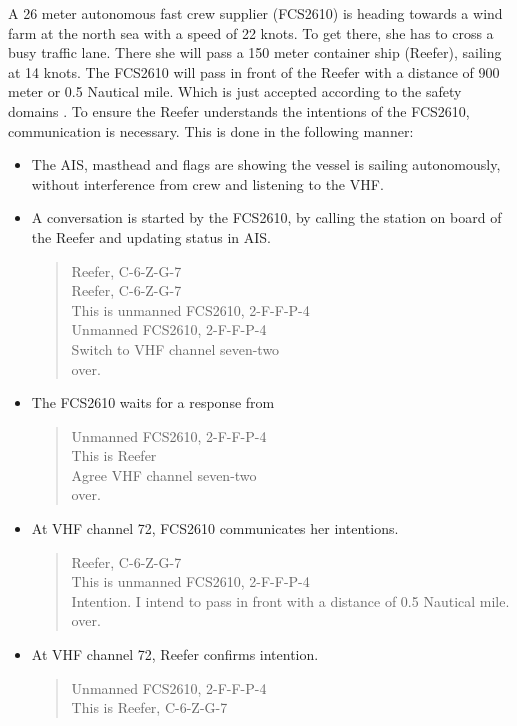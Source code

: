 A 26 meter autonomous fast crew supplier (FCS2610) is heading towards a wind farm at the north sea with a speed of 22 knots. To get there, she has to cross a busy traffic lane. There she will pass a 150 meter container ship (Reefer), sailing at 14 knots. The FCS2610 will pass in front of the Reefer with a distance of 900 meter or 0.5 Nautical mile. Which is just accepted according to the safety domains \cite{Szlapczynski2017a}.
To ensure the Reefer understands the intentions of the FCS2610, communication is necessary. This is done in the following manner:
\begin{itemize}
	\item The \ac{AIS}, masthead and flags are showing the vessel is sailing autonomously, without interference from crew and listening to the \ac{VHF}.
	\item A conversation is started by the FCS2610, by calling the station on board of the Reefer and updating status in \ac{AIS}. 
		\begin{quote}
			Reefer, C-6-Z-G-7\\
			Reefer, C-6-Z-G-7\\
			This is unmanned FCS2610, 2-F-F-P-4 \\
			Unmanned FCS2610, 2-F-F-P-4 \\
			Switch to VHF channel seven-two\\
			over.
		\end{quote}
	\item The FCS2610 waits for a response from 
		\begin{quote}
			Unmanned FCS2610, 2-F-F-P-4 \\
			This is Reefer\\
			Agree VHF channel seven-two\\
			over.
		\end{quote}
	\item At \ac{VHF} channel 72, FCS2610 communicates her intentions.
		\begin{quote}
			Reefer, C-6-Z-G-7\\
			This is unmanned FCS2610, 2-F-F-P-4 \\
			Intention. I intend to pass in front with a distance of 0.5 Nautical mile.\\
			over.
		\end{quote}
	\item At \ac{VHF} channel 72, Reefer confirms intention.
		\begin{quote}
			Unmanned FCS2610, 2-F-F-P-4 \\
			This is Reefer, C-6-Z-G-7\\

\end{quote}
\end{itemize}
